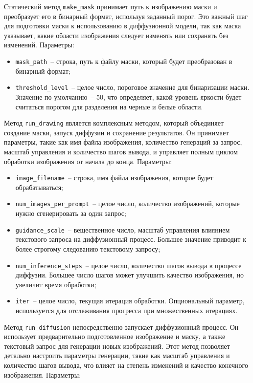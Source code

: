 Статический метод \lstinline{make_mask} принимает путь к изображению маски и преобразует его в бинарный формат, используя заданный порог. Это важный шаг для подготовки маски к использованию в диффузионной модели, так как маска указывает, какие области изображения следует изменять или сохранять без изменений. Параметры:

\begin{itemize}
    \item \lstinline{mask_path}~-- строка, путь к файлу маски, который будет преобразован в бинарный формат;
    \item \lstinline{threshold_level}~-- целое число, пороговое значение для бинаризации маски. Значение по умолчанию~-- 50, что определяет, какой уровень яркости будет считаться порогом для разделения на черные и белые области.
\end{itemize}

Метод \lstinline{run_drawing} является комплексным методом, который объединяет создание маски, запуск диффузии и сохранение результатов. Он принимает параметры, такие как имя файла изображения, количество генераций за запрос, масштаб управления и количество шагов вывода, и управляет полным циклом обработки изображения от начала до конца. Параметры:

\begin{itemize}
    \item \lstinline{image_filename}~-- строка, имя файла изображения, которое будет обрабатываться;
    \item \lstinline{num_images_per_prompt}~-- целое число, количество изображений, которые нужно сгенерировать за один запрос;
    \item \lstinline{guidance_scale}~-- вещественное число, масштаб управления влиянием текстового запроса на диффузионный процесс. Большее значение приводит к более строгому следованию текстовому запросу;
    \item \lstinline{num_inference_steps}~-- целое число, количество шагов вывода в процессе диффузии. Большее число шагов может улучшить качество изображения, но увеличит время обработки;
    \item \lstinline{iter}~-- целое число, текущая итерация обработки. Опциональный параметр, используется для отслеживания прогресса при множественных итерациях.
\end{itemize}

Метод \lstinline{run_diffusion} непосредственно запускает диффузионный процесс. Он использует предварительно подготовленное изображение и маску, а также текстовый запрос для генерации новых изображений. Этот метод позволяет детально настроить параметры генерации, такие как масштаб управления и количество шагов вывода, что влияет на степень изменений и качество конечного изображения. Параметры:

